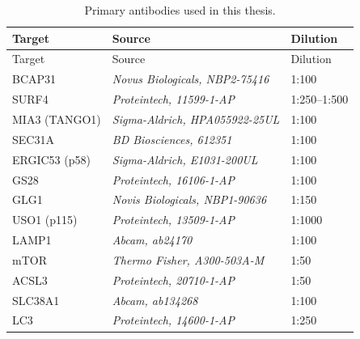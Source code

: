 \documentclass[
  12pt,
  a4paper,
]{book}
\begin{document}
\begin{longtable}[]{@{}lll@{}}
\caption{\label{tab:primary-table}Primary antibodies used in this thesis.}\tabularnewline
\toprule\noalign{}
Target & Source & Dilution \\
\midrule\noalign{}
\endfirsthead
\toprule\noalign{}
Target & Source & Dilution \\
\midrule\noalign{}
\endhead
\bottomrule\noalign{}
\endlastfoot
BCAP31 & \emph{Novus Biologicals, NBP2-75416} & 1:100 \\
SURF4 & \emph{Proteintech, 11599-1-AP} & 1:250--1:500 \\
MIA3 (TANGO1) & \emph{Sigma-Aldrich, HPA055922-25UL} & 1:100 \\
SEC31A & \emph{BD Biosciences, 612351} & 1:100 \\
ERGIC53 (p58) & \emph{Sigma-Aldrich, E1031-200UL} & 1:100 \\
GS28 & \emph{Proteintech, 16106-1-AP} & 1:100 \\
GLG1 & \emph{Novis Biologicals, NBP1-90636} & 1:150 \\
USO1 (p115) & \emph{Proteintech, 13509-1-AP} & 1:1000 \\
LAMP1 & \emph{Abcam, ab24170} & 1:100 \\
mTOR & \emph{Thermo Fisher, A300-503A-M} & 1:50 \\
ACSL3 & \emph{Proteintech, 20710-1-AP} & 1:50 \\
SLC38A1 & \emph{Abcam, ab134268} & 1:100 \\
LC3 & \emph{Proteintech, 14600-1-AP} & 1:250 \\
\end{longtable}
\end{document}
